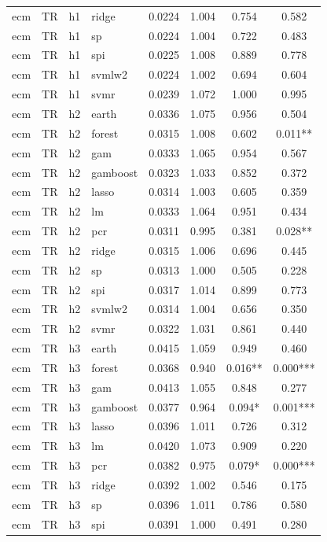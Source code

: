 \begin{ThreePartTable}
\begin{longtable}[t]{llclcccc}
ecm & TR & h1 & ridge & 0.0224 & 1.004 & 0.754 & 0.582\\
ecm & TR & h1 & sp & 0.0224 & 1.004 & 0.722 & 0.483\\
ecm & TR & h1 & spi & 0.0225 & 1.008 & 0.889 & 0.778\\
ecm & TR & h1 & svmlw2 & 0.0224 & 1.002 & 0.694 & 0.604\\
ecm & TR & h1 & svmr & 0.0239 & 1.072 & 1.000 & 0.995\\
\addlinespace
ecm & TR & h2 & earth & 0.0336 & 1.075 & 0.956 & 0.504\\
ecm & TR & h2 & forest & 0.0315 & 1.008 & 0.602 & 0.011**\\
ecm & TR & h2 & gam & 0.0333 & 1.065 & 0.954 & 0.567\\
ecm & TR & h2 & gamboost & 0.0323 & 1.033 & 0.852 & 0.372\\
ecm & TR & h2 & lasso & 0.0314 & 1.003 & 0.605 & 0.359\\
ecm & TR & h2 & lm & 0.0333 & 1.064 & 0.951 & 0.434\\
ecm & TR & h2 & pcr & 0.0311 & 0.995 & 0.381 & 0.028**\\
ecm & TR & h2 & ridge & 0.0315 & 1.006 & 0.696 & 0.445\\
ecm & TR & h2 & sp & 0.0313 & 1.000 & 0.505 & 0.228\\
ecm & TR & h2 & spi & 0.0317 & 1.014 & 0.899 & 0.773\\
ecm & TR & h2 & svmlw2 & 0.0314 & 1.004 & 0.656 & 0.350\\
ecm & TR & h2 & svmr & 0.0322 & 1.031 & 0.861 & 0.440\\
\addlinespace
ecm & TR & h3 & earth & 0.0415 & 1.059 & 0.949 & 0.460\\
ecm & TR & h3 & forest & 0.0368 & 0.940 & 0.016** & 0.000***\\
ecm & TR & h3 & gam & 0.0413 & 1.055 & 0.848 & 0.277\\
ecm & TR & h3 & gamboost & 0.0377 & 0.964 & 0.094* & 0.001***\\
ecm & TR & h3 & lasso & 0.0396 & 1.011 & 0.726 & 0.312\\
ecm & TR & h3 & lm & 0.0420 & 1.073 & 0.909 & 0.220\\
ecm & TR & h3 & pcr & 0.0382 & 0.975 & 0.079* & 0.000***\\
ecm & TR & h3 & ridge & 0.0392 & 1.002 & 0.546 & 0.175\\
ecm & TR & h3 & sp & 0.0396 & 1.011 & 0.786 & 0.580\\
ecm & TR & h3 & spi & 0.0391 & 1.000 & 0.491 & 0.280\\

\end{longtable}
\end{ThreePartTable}
